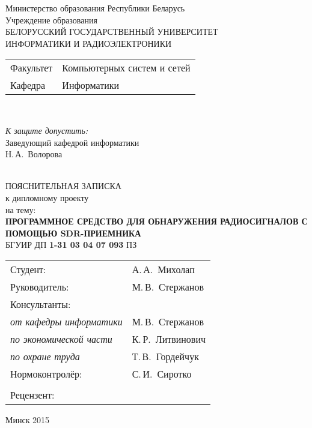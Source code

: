 \begin{titlepage}
  \begin{center}
    Министерство образования Республики Беларусь\\[1em]
    Учреждение образования\\
    БЕЛОРУССКИЙ ГОСУДАРСТВЕННЫЙ УНИВЕРСИТЕТ \\
    ИНФОРМАТИКИ И РАДИОЭЛЕКТРОНИКИ\\[1em]

    \begin{minipage}{\textwidth}
      \begin{flushleft}
        \begin{tabular}{ l l }
          Факультет & Компьютерных систем и сетей\\
          Кафедра   & Информатики
        \end{tabular}
      \end{flushleft}
    \end{minipage}\\[1em]

    \begin{minipage}{\textwidth}
      \begin{flushright}
        \textit{К защите допустить:}\\
        Заведующий кафедрой информатики\\
        \underline{\hspace*{4.5cm}} Н.\,А.~Волорова
      \end{flushright}
    \end{minipage}\\[3em]

    {ПОЯСНИТЕЛЬНАЯ ЗАПИСКА}\\
    {к дипломному проекту}\\
    {на тему:}\\[1em]
    \textbf{\large ПРОГРАММНОЕ СРЕДСТВО ДЛЯ ОБНАРУЖЕНИЯ РАДИОСИГНАЛОВ С ПОМОЩЬЮ SDR-ПРИЕМНИКА}\\[1em]


    {БГУИР ДП \textbf{1-31 03 04 07 093} ПЗ}\\[2em]
    
    \begin{tabular}{ p{}p{} }
      Студент: & А.\,А.~Михолап \\
      Руководитель: & М.\,В.~Стержанов \\
      Консультанты: &\\
      \hspace*{3ex}\emph{от кафедры информатики} & М.\,В.~Стержанов \\
      \hspace*{3ex}\emph{по экономической части} & К.\,Р.~Литвинович \\
      \hspace*{3ex}\emph{по охране труда} & Т.\,В.~Гордейчук \\
      Нормоконтролёр: & С.\,И.~Сиротко\\
      \\
      Рецензент: &
    \end{tabular}
    
    \vfill
    {\normalsize Минск 2015}
  \end{center}
\end{titlepage}
